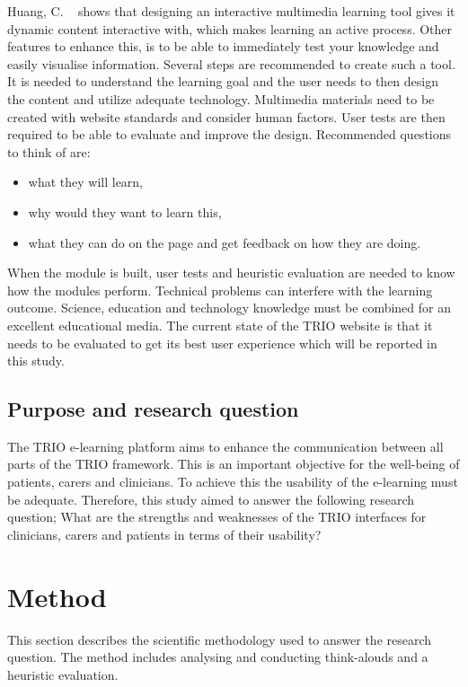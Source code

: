 \documentclass{sigchi}
\begin{document}
Huang, C. ~\cite{Huang2005} shows that designing an interactive multimedia learning tool gives it dynamic content interactive with, which makes learning an active process. Other features to enhance this, is to be able to immediately test your knowledge and easily visualise information. Several steps are recommended to create such a tool. It is needed to understand the learning goal and the user needs to then design the content and utilize adequate technology. Multimedia materials need to be created with website standards and consider human factors. User tests are then required to be able to evaluate and improve the design. Recommended questions to think of are:

\begin{itemize}
    \item what they will learn, 
    \item why would they want to learn this, 
    \item what they can do on the page and get feedback on how they are doing. 
\end{itemize}

When the module is built, user tests and heuristic evaluation are needed to know how the modules perform. Technical problems can interfere with the learning outcome. Science, education and technology knowledge must be combined for an excellent educational media. The current state of the TRIO website is that it needs to be evaluated to get its best user experience which will be reported in this study. 

\subsection{Purpose and research question}
The TRIO e-learning platform aims to enhance the communication between all parts of the TRIO framework. This is an important objective for the well-being of patients, carers and clinicians. To achieve this the usability of the e-learning must be adequate. Therefore, this study aimed to answer the following research question; What are the strengths and weaknesses of the TRIO interfaces for clinicians, carers and patients in terms of their usability?

\section{Method}
This section describes the scientific methodology used to answer the research question. The method includes analysing and conducting think-alouds and a heuristic evaluation.
\end{document}
